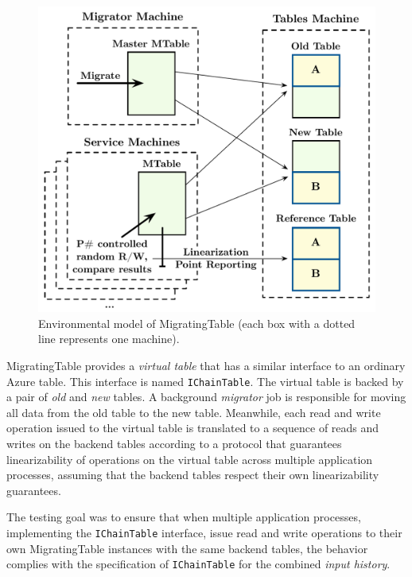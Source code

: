 \begin{figure}[t]
\centering
\includegraphics[width=\linewidth]{img/mocked_migration}
\caption{Environmental model of MigratingTable (each box with a dotted line represents one \psharp machine).}
\label{fig:mockedmigration}
\end{figure}

MigratingTable provides a \emph{virtual table} that has a similar interface to an ordinary Azure table. This interface is named \texttt{IChainTable}. The virtual table is backed by a pair of \emph{old} and \emph{new} tables. A background \emph{migrator} job is responsible for moving all data from the old table to the new table. Meanwhile, each read and write operation issued to the virtual table is translated to a sequence of reads and writes on the backend tables according to a protocol that guarantees linearizability of operations on the virtual table across multiple application processes, assuming that the backend tables respect their own linearizability guarantees.

The \psharp testing goal was to ensure that when multiple application processes, implementing the \texttt{IChainTable} interface, issue read and write operations to their own MigratingTable instances with the same backend tables, the behavior complies with the specification of \texttt{IChainTable} for the combined \emph{input history}.


